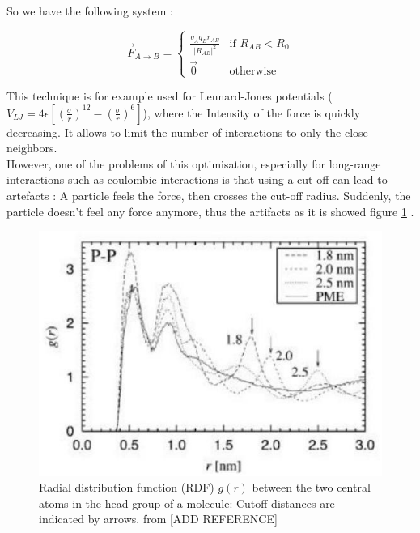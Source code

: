 \documentclass[11pt,twoside,a4paper]{report}
\begin{document}
So we have the following system :


\begin{equation}
  \overrightarrow{F}_{A \rightarrow B}  =
	\begin{cases}
	  \frac{q_A q_B \hat{r}_{AB} }{|R_{AB}|^2}  & \text{if } R_{AB} < R_0 \\
	  \overrightarrow{0} & \text{otherwise}
	\end{cases}
\end{equation}

This technique is for example used for Lennard-Jones potentials ($V_{LJ} = 4\epsilon [(\frac{\sigma}{r})^12 - (\frac{\sigma}{r})^6] $), where the Intensity of the force is quickly decreasing. It allows to limit the number of interactions to only the close neighbors.\\

However, one of the problems of this optimisation, especially for long-range interactions such as coulombic interactions is that using a cut-off can lead to artefacts : A particle feels the force, then crosses the cut-off radius. Suddenly, the particle doesn't feel any force anymore, thus the artifacts as it is showed figure \ref{fig:artefact} .

\begin{figure}[H]

\includegraphics[scale=0.8]{artefact}
 \centering
 
\caption{Radial distribution function (RDF) $g(r)$ between the two
central atoms in the head-group of a molecule: Cutoff distances are indicated by arrows. from [ADD REFERENCE]}

\label{fig:artefact}

\end{figure}
\end{document}
